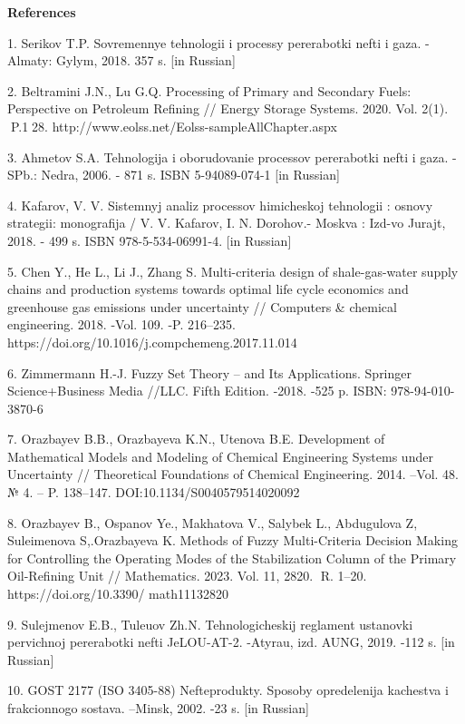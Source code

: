 \begin{center}
	{\bfseries References}
	\end{center}

\begin{noparindent}

1. Serikov T.P. Sovremennye tehnologii i processy pererabotki nefti i
gaza. - Almaty: Gylym, 2018. 357 s. {[}in Russian{]}

2. Beltramini J.N., Lu G.Q. Processing of Primary and Secondary Fuels:
Perspective on Petroleum Refining // Energy Storage Systems. 2020. Vol.
2(1). P.128. http://www.eolss.net/Eolss-sampleAllChapter.aspx

3. Ahmetov S.A. Tehnologija i oborudovanie processov pererabotki nefti i
gaza. - SPb.: Nedra, 2006. - 871 s. ISBN 5-94089-074-1 {[}in Russian{]}

4. Kafarov, V. V. Sistemnyj analiz processov himicheskoj tehnologii :
osnovy strategii: monografija / V. V. Kafarov, I. N. Dorohov.- Moskva :
Izd-vo Jurajt, 2018. - 499 s. ISBN 978-5-534-06991-4. {[}in Russian{]}

5. Chen Y., He L., Li J., Zhang S. Multi-criteria design of
shale-gas-water supply chains and production systems towards optimal
life cycle economics and greenhouse gas emissions under uncertainty //
Computers \& chemical engineering. 2018. -Vol. 109. -P. 216--235.
https://doi.org/10.1016/j.compchemeng.2017.11.014

6. Zimmermann H.-J. Fuzzy Set Theory -- and Its Applications. Springer
Science+Business Media //LLC. Fifth Edition. -2018. -525 p. ISBN:
978-94-010-3870-6

7. Orazbayev B.B., Orazbayeva K.N., Utenova B.E. Development of
Mathematical Models and Modeling of Chemical Engineering Systems under
Uncertainty // Theoretical Foundations of Chemical Engineering. 2014.
--Vol. 48. № 4. -- P. 138--147. DOI:10.1134/S0040579514020092

8. Orazbayev B., Ospanov Ye., Makhatova V., Salybek L., Abdugulova Z,
Suleimenova S,.Orazbayeva K. Methods of Fuzzy Multi-Criteria Decision
Making for Controlling the Operating Modes of the Stabilization Column
of the Primary Oil-Refining Unit // Mathematics. 2023. Vol. 11, 2820.
R. 1--20. https://doi.org/10.3390/ math11132820

9. Sulejmenov E.B., Tuleuov Zh.N. Tehnologicheskij reglament ustanovki
pervichnoj pererabotki nefti JeLOU-AT-2. -Atyrau, izd. AUNG, 2019. -112
s. {[}in Russian{]}

10. GOST 2177 (ISO 3405-88) Nefteprodukty. Sposoby opredelenija
kachestva i frakcionnogo sostava. --Minsk, 2002. -23 s. {[}in Russian{]}


\end{noparindent}
